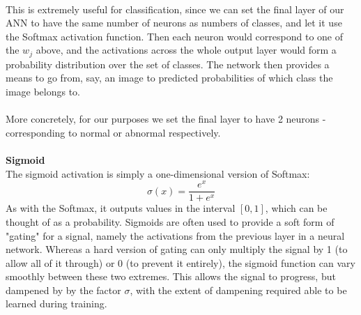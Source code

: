 \documentclass[11pt]{article} %
\theoremstyle{plain}
\theoremstyle{definition}
\begin{document}
\\
\noindent
This is extremely useful for classification, since we can set the final layer of our ANN to have the same number of neurons as numbers of classes, and let it use the Softmax activation function. Then each neuron would correspond to one of the \(w_j\) above, and the activations across the whole output layer would form a probability distribution over the set of classes. The network then provides a means to go from, say, an image to predicted probabilities of which class        the image belongs to. 
\\
\\
\noindent
More concretely, for our purposes we set the final layer to have 2 neurons - corresponding to normal or abnormal respectively.
\\
\\
\noindent
\textbf{Sigmoid}
\\
\noindent
The sigmoid activation is simply a one-dimensional version of Softmax:
\[ \sigma(x) = \dfrac{e^x}{1+e^x}\]
As with the Softmax, it outputs values in the interval \([0,1]\), which can be thought of as a probability. Sigmoids are often used to provide a soft form of "gating" for a signal, namely the activations from the previous layer in a neural network. Whereas a hard version of gating can only multiply the signal by 1 (to allow all of it through) or 0 (to prevent it entirely), the sigmoid function can vary smoothly between these two extremes. This allows the signal to progress, but dampened by by the factor \(\sigma\), with the extent of dampening required able to be learned during training.  
\newpage
\end{document}
